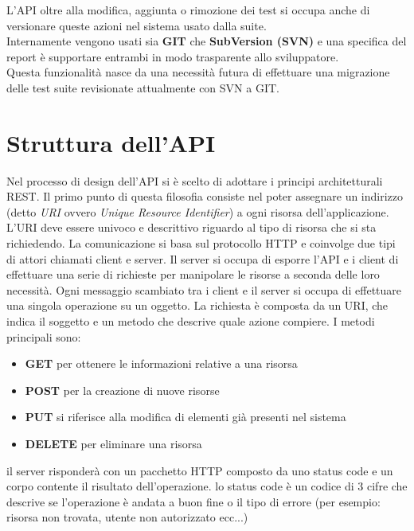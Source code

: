         L'API oltre alla modifica, aggiunta o rimozione dei test si occupa anche di versionare queste azioni nel sistema usato dalla suite.\\
        Internamente vengono usati sia \textbf{GIT} che \textbf{SubVersion (SVN)} e una specifica del report è supportare entrambi in modo trasparente allo sviluppatore.\\
        Questa funzionalità nasce da una necessità futura di effettuare una migrazione delle test suite revisionate attualmente con SVN a GIT.\\
            
    \section{Struttura dell'API}
        Nel processo di design dell'API si è scelto di adottare i principi architetturali REST.
        Il primo punto di questa filosofia consiste nel poter assegnare un indirizzo (detto \textit{URI} ovvero \textit{Unique Resource Identifier}) a ogni risorsa dell'applicazione.
        L'URI deve essere univoco e descrittivo riguardo al tipo di risorsa che si sta richiedendo.
        La comunicazione si basa sul protocollo HTTP e coinvolge due tipi di attori chiamati client e server.
        Il server si occupa di esporre l'API e i client di effettuare una serie di richieste per manipolare le risorse a seconda delle loro necessità.
        Ogni messaggio scambiato tra i client e il server si occupa di effettuare una singola operazione su un oggetto.
        La richiesta è composta da un URI, che  indica il soggetto e un metodo che descrive quale azione compiere.
        I metodi principali sono:
        
        \begin{itemize}
            \item \textbf{GET} per ottenere le informazioni relative a una risorsa
            \item \textbf{POST} per la creazione di nuove risorse

            \item \textbf{PUT} si riferisce alla modifica di elementi già presenti nel sistema
            \item \textbf{DELETE} per eliminare una risorsa
        \end{itemize}
        
        il server risponderà con un pacchetto HTTP composto da uno status code e un corpo contente il risultato dell'operazione.
        lo status code è un codice di 3 cifre che descrive se l'operazione è andata a buon fine o il tipo di errore (per esempio: risorsa non trovata, utente non autorizzato ecc...)
        
